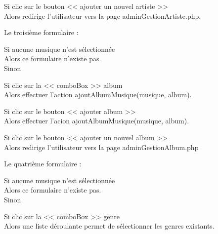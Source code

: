 \begin{paragraphe}
			\begin{paragraphe}
				Si clic sur le bouton << ajouter un nouvel artiste >> \\
				Alors redirige l'utilisateur vers la page adminGestionArtiste.php.
			\end{paragraphe}

			\begin{paragraphe}
				Le troisième formulaire :
			\end{paragraphe}

			\begin{paragraphe}
				Si aucune musique n'est sélectionnée \\
				Alors ce formulaire n'existe pas. \\
				Sinon
			\end{paragraphe}

			\begin{paragraphe}
				Si clic sur la << comboBox >> album \\
				Alors effectuer l'action ajoutAlbumMusique(musique, album).
			\end{paragraphe}

			\begin{paragraphe}
				Si clic sur le bouton << ajouter album >> \\
				Alors effectuer l'acion ajoutAlbumMusique(musique, album).
			\end{paragraphe}

			\begin{paragraphe}
				Si clic sur le bouton << ajouter un nouvel album >> \\
				Alors redirige l'utilisateur vers la page adminGestionAlbum.php
			\end{paragraphe}

			\begin{paragraphe}
				Le quatrième formulaire :
			\end{paragraphe}

			\begin{paragraphe}
				Si aucune musique n'est sélectionnée \\
				Alors ce formulaire n'existe pas. \\
				Sinon
			\end{paragraphe}

			\begin{paragraphe}
				Si clic sur la << comboBox >> genre \\
				Alors une liste déroulante permet de sélectionner les genres existants.
			\end{paragraphe}


\end{paragraphe}
